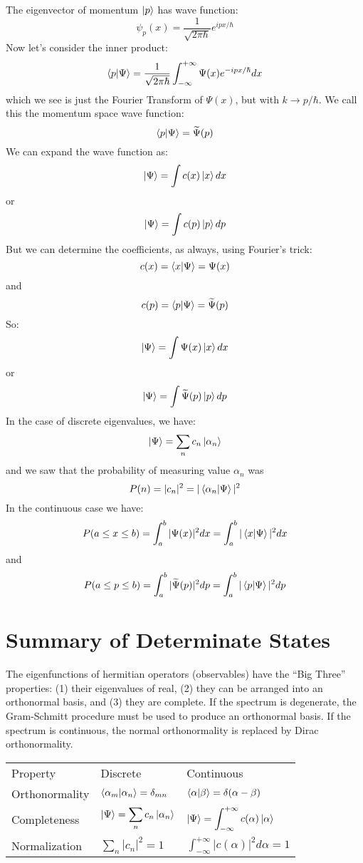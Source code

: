 \documentclass[12pt]{book}
\begin{document}
The eigenvector of momentum $\ket{p}$ has wave function:
$$\psi_p(x) = \frac{1}{\sqrt{2\pi \hbar}} e^{\displaystyle i p x / \hbar}$$
Now let's consider the inner product:
$$\braket{p|\Psi} = \frac{1}{\sqrt{2\pi\hbar}}\int_{-\infty}^{+\infty} \Psi(x) e^{-ipx/\hbar} dx $$
which we see is just the Fourier Transform of $\Psi(x)$, but with $k \to p/\hbar$.   We call this the momentum space wave function:
$$\braket{p|\Psi} = \widetilde{\Psi}(p)$$
We can expand the wave function as:
$$\ket{\Psi} = \int c(x) \ket{x} dx$$
or
$$\ket{\Psi} = \int c(p) \ket{p} dp$$
But we can determine the coefficients, as always, using Fourier's trick:
$$c(x) = \braket{x|\Psi} = \Psi(x)$$
and
$$c(p) = \braket{p|\Psi} = \widetilde{\Psi}(p)$$
So:
$$\ket{\Psi} = \int \Psi(x) \ket{x} dx$$
or
$$\ket{\Psi} = \int \widetilde{\Psi}(p) \ket{p} dp$$
In the case of discrete eigenvalues, we have:
$$\ket{\Psi} = \sum_n c_n \ket{\alpha_n}$$
and we saw that the probability of measuring value $\alpha_n$ was 
$$P(n) = |c_n|^2 = |\braket{\alpha_n|\Psi}|^2$$
In the continuous case we have:
$$P(a\leq x \leq b) = \int_{a}^{b}|\Psi(x)|^2 dx = \int_{a}^{b}|\braket{x|\Psi}|^2 dx$$
and
$$P(a \leq p \leq b) = \int_{a}^{b}|\widetilde{\Psi}(p)|^2 dp = \int_{a}^{b}|\braket{p|\Psi}|^2 dp$$

 
\section{Summary of Determinate States}

The eigenfunctions of hermitian operators (observables) have the ``Big
Three'' properties: (1) their eigenvalues of real, (2) they can be
arranged into an orthonormal basis, and (3) they are complete.  If the
spectrum is degenerate, the Gram-Schmitt procedure must be used to
produce an orthonormal basis.  If the spectrum is continuous, the
normal orthonormality is replaced by Dirac orthonormality.

\begin{center}
\begin{tabular}{lll}
Property       & Discrete & Continuous \\[8pt]
Orthonormality & $\braket{\alpha_m|\alpha_n} = \delta_{mn}$ & $\braket{\alpha|\beta} = \delta(\alpha-\beta)$ \\[8pt]
Completeness   & $\displaystyle \ket{\Psi} = \sum_n c_n \ket{\alpha_n}$ & 
$\displaystyle \ket{\Psi} = \int_{-\infty}^{+\infty} c(\alpha) \ket{\alpha}$\\[8pt]
Normalization  & $\displaystyle \sum_n |c_n|^2 = 1$ & 
$\displaystyle \int_{-\infty}^{+\infty} |c(\alpha)|^2  d\alpha = 1$ \\[8pt]
\end{tabular}
\end{center}
\end{document}
